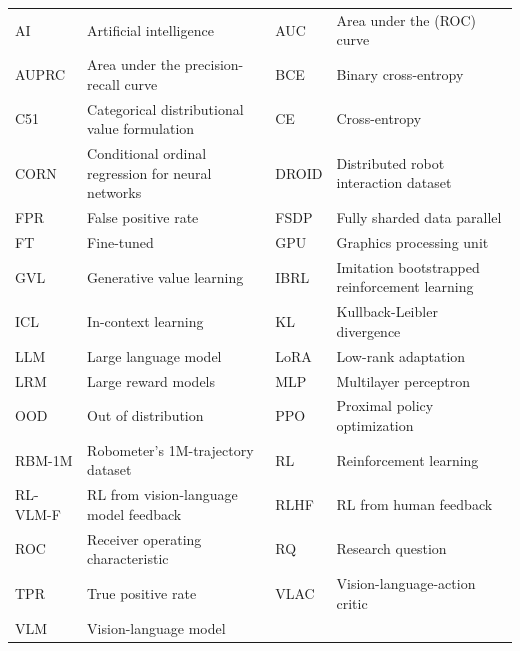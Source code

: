 \vspace{4pt}
\begin{tabular}{@{}p{1.8cm}p{6.1cm}p{1.8cm}p{6.1cm}@{}}
AI & Artificial intelligence & AUC & Area under the (ROC) curve \\
AUPRC & Area under the precision-recall curve & BCE & Binary cross-entropy \\
C51 & Categorical distributional value formulation & CE & Cross-entropy \\
CORN & Conditional ordinal regression for neural networks & DROID & Distributed robot interaction dataset \\
FPR & False positive rate & FSDP & Fully sharded data parallel \\
FT & Fine-tuned & GPU & Graphics processing unit \\
GVL & Generative value learning & IBRL & Imitation bootstrapped reinforcement learning \\
ICL & In-context learning & KL & Kullback-Leibler divergence \\
LLM & Large language model & LoRA & Low-rank adaptation \\
LRM & Large reward models & MLP & Multilayer perceptron \\
OOD & Out of distribution & PPO & Proximal policy optimization \\
RBM-1M & Robometer's 1M-trajectory dataset & RL & Reinforcement learning \\
RL-VLM-F & RL from vision-language model feedback & RLHF & RL from human feedback \\
ROC & Receiver operating characteristic & RQ & Research question \\
TPR & True positive rate & VLAC & Vision-language-action critic \\
VLM & Vision-language model & & \\
\end{tabular}
